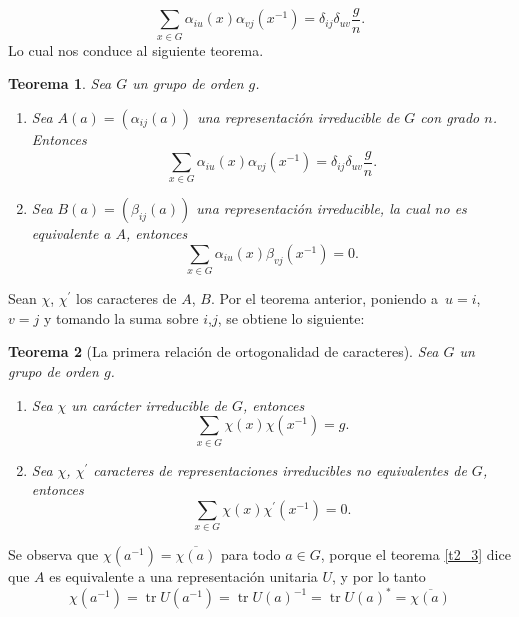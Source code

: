 \documentclass[12pt]{book}
\DeclareMathOperator{\tr}{tr}
\newtheorem{theorem}{Teorema}[section]
\theoremstyle{definition}
\newcounter{in}
\begin{document}
\begin{equation}
  \label{eq:31}
  \sum_{x \in G} \alpha_{iu}(x) \alpha_{vj}(x^{-1}) = \delta_{ij} \delta_{uv}\frac{g}{n}.
\end{equation}
Lo cual nos conduce al siguiente teorema.
\begin{theorem}
  \label{t4_3}
  Sea $G$ un grupo de orden $g$.
  \begin{enumerate}
  \item Sea $A(a)=(\alpha_{ij}(a))$ una representación irreducible de
    $G$ con grado $n$. Entonces
    \begin{equation*}
      \sum_{x \in G} \alpha_{iu}(x) \alpha_{vj}(x^{-1})
      = \delta_{ij} \delta_{uv}\frac{g}{n}.
    \end{equation*}
  \item Sea $ B(a)=(\beta_{ij}(a))$ una representación irreducible, la
    cual no es equivalente a $A$, entonces
    \begin{equation*}
      \sum_{x \in G} \alpha_{iu}(x) \beta_{vj}(x^{-1}) =0.
    \end{equation*}
    \end{enumerate}
\end{theorem}
Sean $\chi$, $\chi^{'}$ los caracteres de $A$, $B$. Por el teorema
anterior, poniendo a~$u=i$, $v=j$ y tomando la suma sobre $i$,$j$, se
obtiene lo siguiente:
\begin{theorem}[La primera relación de ortogonalidad de caracteres]
  \label{t4_4}
  Sea $G$ un grupo de orden $g$.
  \begin{enumerate}
  \item Sea $\chi$ un carácter irreducible de $G$, entonces 
  \begin{equation*}
    \sum_{x \in G} \chi(x) \chi(x^{-1}) = g.
  \end{equation*}
  \item Sea $\chi$, $\chi^{'}$ caracteres de representaciones
    irreducibles no equivalentes de $G$, entonces
  \begin{equation*}
    \sum_{x \in G} \chi(x) \chi^{'}(x^{-1}) = 0.
  \end{equation*}
  \end{enumerate}
\end{theorem}
Se observa que $\chi(a^{-1})=\overline{\chi(a)}$ para todo $a \in G$,
porque el teorema \ref{t2_3} dice que $A$ es equivalente a una
representación unitaria $U$, y por lo tanto
\begin{equation}
  \label{eq:34}
  \chi(a^{-1})=\tr U(a^{-1})=\tr U(a)^{-1}=\tr U(a)^{*} = \overline{\chi(a)}  
\end{equation}
\end{document}
